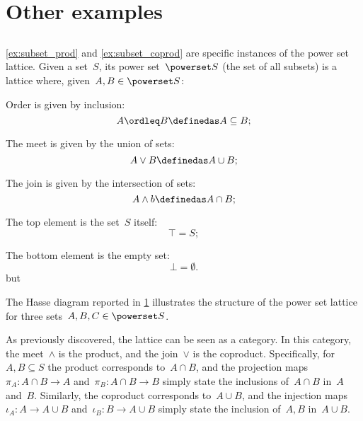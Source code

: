 \section{Other examples}

\subsection{}
\cref{ex:subset_prod} and \cref{ex:subset_coprod} are specific instances of the power set lattice. Given a set~$S$, its power set~$\powerset S$ (the set of all subsets) is a lattice where, given~$A,B\in \powerset S$:
\begin{compactitem}
  \item Order is given by inclusion:
  \begin{equation*}
    A\ordleq B \definedas A\subseteq B;
  \end{equation*}
  \item The meet is given by the union of sets:
  \begin{equation*}
    A\vee B \definedas A\cup B;
  \end{equation*}
  \item The join is given by the intersection of sets:
  \begin{equation*}
    A\wedge b \definedas A\cap B;
  \end{equation*}
  \item The top element is the set~$S$ itself:
  \begin{equation*}
    \top = S;
  \end{equation*}
  \item The bottom element is the empty set:
  \begin{equation*}
    \bot = \emptyset.
  \end{equation*}but
\end{compactitem}
The Hasse diagram reported in \cref{fig:prod_coprod_power} illustrates the structure of the power set lattice for three sets~$A,B,C\in \powerset S$.

\begin{figure}[h]
  \begin{center}
  \end{center}
  \caption{\label{fig:prod_coprod_power}}
\end{figure}
As previously discovered, the lattice can be seen as a category.
In this category, the meet~$\wedge$ is the product, and the join~$\vee$ is the coproduct.
Specifically, for~$A,B\subseteq S$ the product corresponds to~$A\cap B$, and the projection maps~$\pi_A\colon A\cap B\to A$ and~$\pi_B\colon A\cap B\to B$ simply state the inclusions of~$A\cap B$ in~$A$ and~$B$.
Similarly, the coproduct corresponds to~$A\cup B$, and the injection maps~$\iota_A\colon A\to A\cup B$ and~$\iota_B\colon B\to A\cup B$ simply state the inclusion of~$A,B$ in~$A\cup B$.

\subsubsection{}

